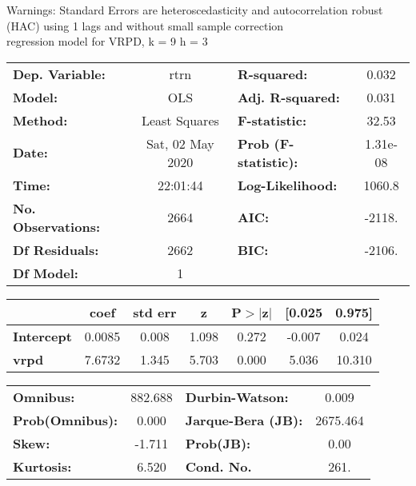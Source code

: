 Warnings: \newline
 [1] Standard Errors are heteroscedasticity and autocorrelation robust (HAC) using 1 lags and without small sample correction\\ 

regression model for VRPD, k = 9 h = 3\begin{center}
\begin{tabular}{lclc}
\toprule
\textbf{Dep. Variable:}    &       rtrn       & \textbf{  R-squared:         } &     0.032   \\
\textbf{Model:}            &       OLS        & \textbf{  Adj. R-squared:    } &     0.031   \\
\textbf{Method:}           &  Least Squares   & \textbf{  F-statistic:       } &     32.53   \\
\textbf{Date:}             & Sat, 02 May 2020 & \textbf{  Prob (F-statistic):} &  1.31e-08   \\
\textbf{Time:}             &     22:01:44     & \textbf{  Log-Likelihood:    } &    1060.8   \\
\textbf{No. Observations:} &        2664      & \textbf{  AIC:               } &    -2118.   \\
\textbf{Df Residuals:}     &        2662      & \textbf{  BIC:               } &    -2106.   \\
\textbf{Df Model:}         &           1      & \textbf{                     } &             \\
\bottomrule
\end{tabular}
\begin{tabular}{lcccccc}
                   & \textbf{coef} & \textbf{std err} & \textbf{z} & \textbf{P$> |$z$|$} & \textbf{[0.025} & \textbf{0.975]}  \\
\midrule
\textbf{Intercept} &       0.0085  &        0.008     &     1.098  &         0.272        &       -0.007    &        0.024     \\
\textbf{vrpd}      &       7.6732  &        1.345     &     5.703  &         0.000        &        5.036    &       10.310     \\
\bottomrule
\end{tabular}
\begin{tabular}{lclc}
\textbf{Omnibus:}       & 882.688 & \textbf{  Durbin-Watson:     } &    0.009  \\
\textbf{Prob(Omnibus):} &   0.000 & \textbf{  Jarque-Bera (JB):  } & 2675.464  \\
\textbf{Skew:}          &  -1.711 & \textbf{  Prob(JB):          } &     0.00  \\
\textbf{Kurtosis:}      &   6.520 & \textbf{  Cond. No.          } &     261.  \\
\bottomrule
\end{tabular}
\end{center}

